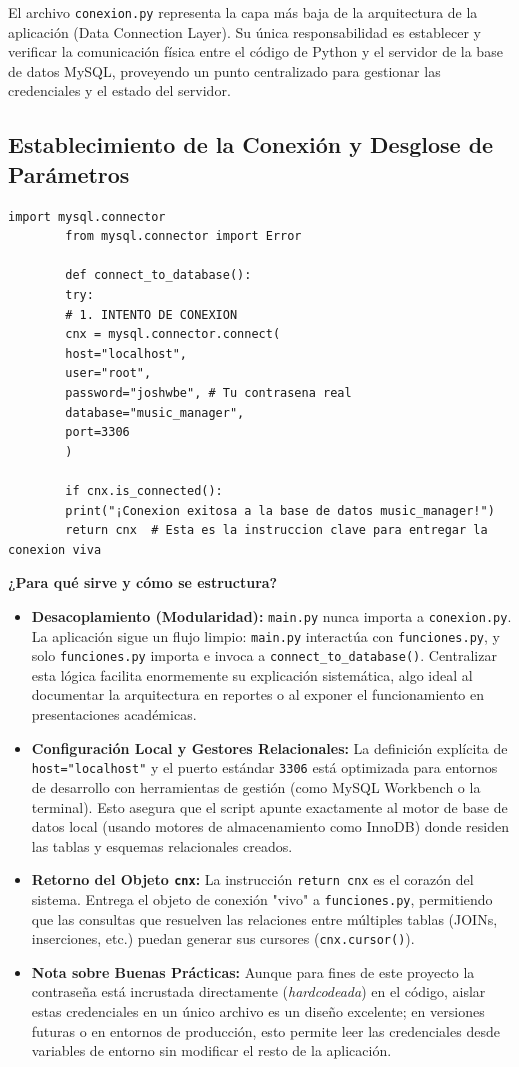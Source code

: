 \documentclass[11pt]{article}
\begin{document}
	El archivo \texttt{conexion.py} representa la capa más baja de la arquitectura de la aplicación (Data Connection Layer). Su única responsabilidad es establecer y verificar la comunicación física entre el código de Python y el servidor de la base de datos MySQL, proveyendo un punto centralizado para gestionar las credenciales y el estado del servidor.
	
	\subsection{Establecimiento de la Conexión y Desglose de Parámetros}
	\begin{lstlisting}[style=pythonstyle]
		import mysql.connector
		from mysql.connector import Error
		
		def connect_to_database():
		try:
		# 1. INTENTO DE CONEXION
		cnx = mysql.connector.connect(
		host="localhost",
		user="root",
		password="joshwbe", # Tu contrasena real
		database="music_manager", 
		port=3306
		)
		
		if cnx.is_connected():
		print("¡Conexion exitosa a la base de datos music_manager!")
		return cnx  # Esta es la instruccion clave para entregar la conexion viva
	\end{lstlisting}
	
	\noindent\textbf{¿Para qué sirve y cómo se estructura?}
	\begin{itemize}[noitemsep,topsep=2pt]
		\item \textbf{Desacoplamiento (Modularidad):} \texttt{main.py} nunca importa a \texttt{conexion.py}. La aplicación sigue un flujo limpio: \texttt{main.py} interactúa con \texttt{funciones.py}, y solo \texttt{funciones.py} importa e invoca a \texttt{connect\_to\_database()}. Centralizar esta lógica facilita enormemente su explicación sistemática, algo ideal al documentar la arquitectura en reportes o al exponer el funcionamiento en presentaciones académicas.
		\item \textbf{Configuración Local y Gestores Relacionales:} La definición explícita de \texttt{host="localhost"} y el puerto estándar \texttt{3306} está optimizada para entornos de desarrollo con herramientas de gestión (como MySQL Workbench o la terminal). Esto asegura que el script apunte exactamente al motor de base de datos local (usando motores de almacenamiento como InnoDB) donde residen las tablas y esquemas relacionales creados.
		\item \textbf{Retorno del Objeto \texttt{cnx}:} La instrucción \texttt{return cnx} es el corazón del sistema. Entrega el objeto de conexión "vivo" a \texttt{funciones.py}, permitiendo que las consultas que resuelven las relaciones entre múltiples tablas (JOINs, inserciones, etc.) puedan generar sus cursores (\texttt{cnx.cursor()}).
		\item \textbf{Nota sobre Buenas Prácticas:} Aunque para fines de este proyecto la contraseña está incrustada directamente (\textit{hardcodeada}) en el código, aislar estas credenciales en un único archivo es un diseño excelente; en versiones futuras o en entornos de producción, esto permite leer las credenciales desde variables de entorno sin modificar el resto de la aplicación.
	\end{itemize}
	
\end{document}

